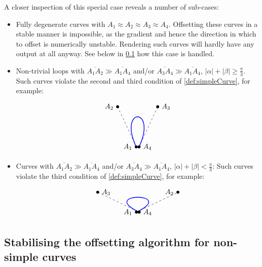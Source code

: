 \documentclass[12pt,a4paper]{article}
\theoremstyle{definition}
\begin{document}
A closer inspection of this special case reveals a number of sub-cases:
\begin{itemize}
  \item Fully degenerate curves with $A_1 \approx A_2 \approx A_3 \approx A_4$. Offsetting these curves in a stable manner is impossible, as the gradient and hence the direction in which to offset is numerically unstable. Rendering such curves will hardly have any output at all anyway. See below in \cref{subsec:stabilisation} how this case is handled.
  \item Non-trivial loops with $\overline{A_1A_2} \gg \overline{A_1A_4}$ and/or $\overline{A_3A_4} \gg \overline{A_1A_4}$, $|\alpha| + |\beta| \geq \tfrac{\pi}{3}$. Such curves violate the second and third condition of \cref{def:simpleCurve}, for example:
  \[
  \begin{tikzpicture}[every node/.append style={inner sep=1.5pt, circle, fill}]
    \coordinate (A1) at (-.07, 0);
    \coordinate (A2) at (-1, 2);
    \coordinate (A3) at (1, 2);
    \coordinate (A4) at (.07, 0);
    \draw[dashed] (A1) -- (A2) (A3) -- (A4);
    \draw[line width=1pt, blue] (A1) .. controls (A2) and (A3) .. (A4);
    \node[label={left:$A_1$}] at (A1) {};
    \node[label={left:$A_2$}] at (A2) {};
    \node[label={right:$A_3$}] at (A3) {};
    \node[label={right:$A_4$}] at (A4) {};
  \end{tikzpicture}
  \]
  \item Curves with $\overline{A_1A_2} \gg \overline{A_1A_4}$ and/or $\overline{A_3A_4} \gg \overline{A_1A_4}$,  $|\alpha| + |\beta| < \tfrac{\pi}{3}$: Such curves violate the third condition of \cref{def:simpleCurve}, for example:
  \[
  \begin{tikzpicture}[every node/.append style={inner sep=1.5pt, circle, fill}]
    \coordinate (A1) at (-.07, 0);
    \coordinate (A3) at (-2, 1);
    \coordinate (A2) at (2, 1);
    \coordinate (A4) at (.07, 0);
    \draw[dashed] (A1) -- (A2) (A3) -- (A4);
    \draw[line width=1pt, blue] (A1) .. controls (A2) and (A3) .. (A4);
    \node[label={left:$A_1$}] at (A1) {};
    \node[label={left:$A_2$}] at (A2) {};
    \node[label={right:$A_3$}] at (A3) {};
    \node[label={right:$A_4$}] at (A4) {};
  \end{tikzpicture}
  \]
\end{itemize}

\subsection{Stabilising the offsetting algorithm for non-simple curves}
\label{subsec:stabilisation}
\end{document}
